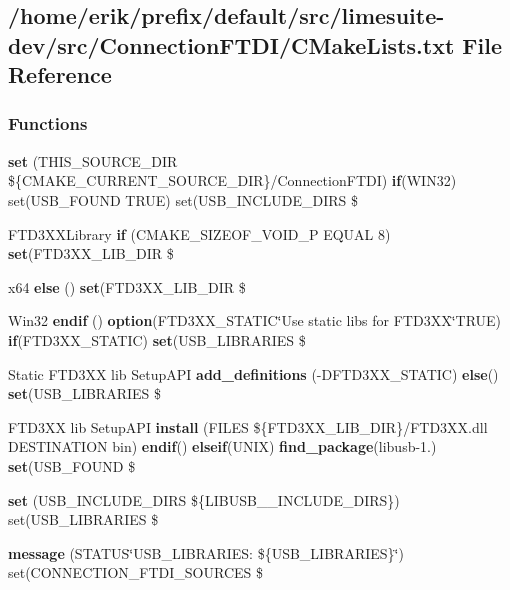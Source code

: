 \subsection{/home/erik/prefix/default/src/limesuite-\/dev/src/\+Connection\+F\+T\+D\+I/\+C\+Make\+Lists.txt File Reference}
\label{limesuite-dev_2src_2ConnectionFTDI_2CMakeLists_8txt}
\subsubsection*{Functions}
\begin{DoxyCompactItemize}
\item 
{\bf set} (T\+H\+I\+S\+\_\+\+S\+O\+U\+R\+C\+E\+\_\+\+D\+IR \$\{C\+M\+A\+K\+E\+\_\+\+C\+U\+R\+R\+E\+N\+T\+\_\+\+S\+O\+U\+R\+C\+E\+\_\+\+D\+IR\}/Connection\+F\+T\+DI) {\bf if}(W\+I\+N32) set(U\+S\+B\+\_\+\+F\+O\+U\+ND T\+R\+UE) set(U\+S\+B\+\_\+\+I\+N\+C\+L\+U\+D\+E\+\_\+\+D\+I\+RS \$
\item 
F\+T\+D3\+X\+X\+Library {\bf if} (C\+M\+A\+K\+E\+\_\+\+S\+I\+Z\+E\+O\+F\+\_\+\+V\+O\+I\+D\+\_\+P E\+Q\+U\+AL 8) {\bf set}(F\+T\+D3\+X\+X\+\_\+\+L\+I\+B\+\_\+\+D\+IR \$
\item 
x64 {\bf else} () {\bf set}(F\+T\+D3\+X\+X\+\_\+\+L\+I\+B\+\_\+\+D\+IR \$
\item 
Win32 {\bf endif} () {\bf option}(F\+T\+D3\+X\+X\+\_\+\+S\+T\+A\+T\+IC\char`\"{}Use static libs for F\+T\+D3\+XX\char`\"{}T\+R\+UE) {\bf if}(F\+T\+D3\+X\+X\+\_\+\+S\+T\+A\+T\+IC) {\bf set}(U\+S\+B\+\_\+\+L\+I\+B\+R\+A\+R\+I\+ES \$
\item 
Static F\+T\+D3\+XX lib Setup\+A\+PI {\bf add\+\_\+definitions} (-\/D\+F\+T\+D3\+X\+X\+\_\+\+S\+T\+A\+T\+IC) {\bf else}() {\bf set}(U\+S\+B\+\_\+\+L\+I\+B\+R\+A\+R\+I\+ES \$
\item 
F\+T\+D3\+XX lib Setup\+A\+PI {\bf install} (F\+I\+L\+ES \$\{F\+T\+D3\+X\+X\+\_\+\+L\+I\+B\+\_\+\+D\+IR\}/F\+T\+D3\+X\+X.\+dll D\+E\+S\+T\+I\+N\+A\+T\+I\+ON bin) {\bf endif}() {\bf elseif}(U\+N\+IX) {\bf find\+\_\+package}(libusb-\/1.) {\bf set}(U\+S\+B\+\_\+\+F\+O\+U\+ND \$
\item 
{\bf set} (U\+S\+B\+\_\+\+I\+N\+C\+L\+U\+D\+E\+\_\+\+D\+I\+RS \$\{L\+I\+B\+U\+S\+B\+\_\+\_\+\+I\+N\+C\+L\+U\+D\+E\+\_\+\+D\+I\+RS\}) set(U\+S\+B\+\_\+\+L\+I\+B\+R\+A\+R\+I\+ES \$
\item 
{\bf message} (S\+T\+A\+T\+US\char`\"{}U\+S\+B\+\_\+\+L\+I\+B\+R\+A\+R\+I\+E\+S\+: \$\{U\+S\+B\+\_\+\+L\+I\+B\+R\+A\+R\+I\+ES\}\char`\"{}) set(C\+O\+N\+N\+E\+C\+T\+I\+O\+N\+\_\+\+F\+T\+D\+I\+\_\+\+S\+O\+U\+R\+C\+ES \$
\end{DoxyCompactItemize}


